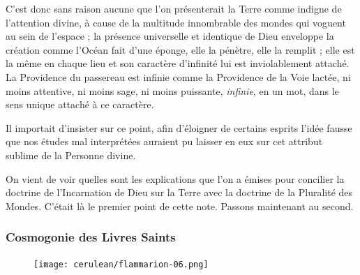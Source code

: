\documentclass[a4paper, 11pt, oneside, landscape]{article}
\begin{document}
C'est donc sans raison aucune que l'on présenterait la Terre comme indigne de l'attention divine, à cause de la multitude innombrable des mondes qui voguent au sein de l'espace ; la présence universelle et identique de Dieu enveloppe la création comme l'Océan fait d'une éponge, elle la pénètre, elle la remplit ; elle est la même en chaque lieu et son caractère d'infinité lui est inviolablement attaché. La Providence du passereau est infinie comme la Providence de la Voie lactée, ni moins attentive, ni moins sage, ni moins puissante, \emph{infinie}, en un mot, dans le sens unique attaché à ce caractère.

Il importait d'insister sur ce point, afin d'éloigner de certains esprits l'idée fausse que nos études mal interprétées auraient pu laisser en eux sur cet attribut sublime de la Personne divine.

On vient de voir quelles sont les explications que l'on a émises pour concilier la doctrine de l'Incarnation de Dieu sur la Terre avec la doctrine de la Pluralité des Mondes. C'était là le premier point de cette note. Passons maintenant au second.

\subsubsection{Cosmogonie des Livres Saints}
\begin{figure}[H]
\centering
\texttt{[image: cerulean/flammarion-06.png]}
\end{figure}
\end{document}
